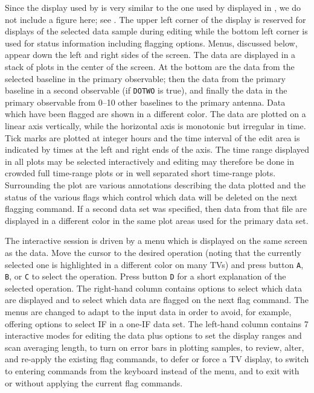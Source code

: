      Since the display used by {\tt {}} is very similar to
the one used by {\tt {}} displayed in , we do not
include a figure here; see .  The upper left corner of the
display is reserved for displays of the selected data sample during
editing while the bottom left corner is used for status information
including flagging options.  Menus, discussed below, appear down the
left and right sides of the screen.  The data are displayed in a stack
of plots in the center of the screen.  At the bottom are the data from
the selected baseline in the primary observable; then the data from
the primary baseline in a second observable (if {\tt DOTWO} is true),
and finally the data in the primary observable from 0--10 other
baselines to the primary antenna.  Data which have been flagged are
shown in a different color.  The data are plotted on a linear axis
vertically, while the horizontal axis is monotonic but irregular in
time.  Tick marks are plotted at integer hours and the time interval
of the edit area is indicated by times at the left and right ends of
the axis. The time range displayed in all plots may be selected
interactively and editing may therefore be done in crowded full
time-range plots or in well separated short time-range plots.
Surrounding the plot are various annotations describing the data
plotted and the status of the various flags which control which data
will be deleted on the next flagging command.  If a second data set
was specified, then data from that file are displayed in a different
color in the same plot areas used for the primary data
set.

     The interactive session is driven by a menu which is displayed on
the same screen as the data.  Move the cursor to the desired operation
(noting that the currently selected one is highlighted in a different
color on many TVs) and press button {\tt A}, {\tt B}, or {\tt C} to
select the operation.  Press button {\tt D} for a short explanation of
the selected operation.   The right-hand column contains options to
select which data are displayed and to select which data are flagged
on the next flag command.  The menus are changed to adapt to the input
data in order to avoid, for example, offering options to select IF in
a one-IF data set.  The left-hand column contains 7 interactive modes
for editing the data plus options to set the display ranges and scan
averaging length, to turn on error bars in plotting samples, to
review, alter, and re-apply the existing flag commands, to defer or
force a TV display, to switch to entering commands from the keyboard
instead of the menu, and to exit with or without applying the current
flag commands.

